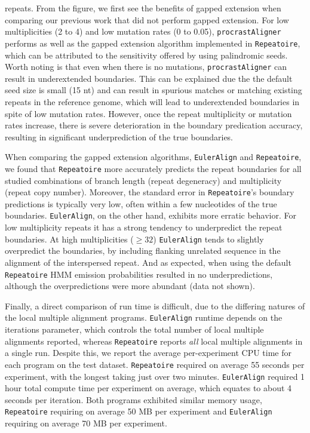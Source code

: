\documentclass[12pt,journal,draftcls,letterpaper,onecolumn]{IEEEtran}
\begin{document}
repeats. From the figure, we first see the benefits of gapped extension when comparing our previous work
that did not perform gapped extension. For low multiplicities (2 to 4) and low mutation rates (0 to 0.05), \texttt{procrastAligner} performs as well
as the gapped extension algorithm implemented in \texttt{Repeatoire}, which can be attributed to the sensitivity offered by using palindromic seeds. Worth noting is that even when there is no mutations, \texttt{procrastAligner} can result in underextended boundaries. This can be explained due the the default seed size is small (15 nt) and can result in spurious matches or matching existing repeats in the reference genome, which will lead to underextended boundaries in spite of low mutation rates. However, once the repeat multiplicity or mutation rates increase, there is severe deterioration in the boundary predication accuracy, resulting in significant underprediction of the true boundaries.

When comparing the gapped extension algorithms, \texttt{EulerAlign} and \texttt{Repeatoire}, we found that \texttt{Repeatoire} more accurately predicts
the repeat boundaries for all studied combinations of branch length (repeat degeneracy)
and multiplicity (repeat copy number).  Moreover, the standard error in \texttt{Repeatoire}'s
boundary predictions is typically very low, often within a few nucleotides of the true boundaries.  \texttt{EulerAlign}, on the other hand,
exhibits more erratic behavior.  For low multiplicity repeats it has a strong tendency to
underpredict the repeat boundaries.  At high multiplicities ($\geq32$) \texttt{EulerAlign} tends to
slightly overpredict the boundaries, by including flanking unrelated sequence in the alignment of
the interspersed repeat.  And as expected, when using the default \texttt{Repeatoire} HMM emission probabilities resulted in no underpredictions, although the overpredictions were more abundant (data not shown).


Finally, a direct comparison of run time is difficult, due to the differing natures of the local multiple alignment programs.  \texttt{EulerAlign} runtime depends on the iterations parameter, which controls the total number of local multiple alignments reported, whereas \texttt{Repeatoire} reports \textit{all} local multiple alignments in a single run.  Despite this, we report the average per-experiment CPU time for each program on the test dataset. \texttt{Repeatoire} required on average 55 seconds per experiment, with the longest taking just over two minutes. \texttt{EulerAlign} required 1 hour total compute time per experiment on average, which equates to about 4 seconds per iteration.  Both programs exhibited similar memory usage, \texttt{Repeatoire} requiring on average 50 MB per experiment and \texttt{EulerAlign} requiring on average 70 MB per experiment.
\end{document}
